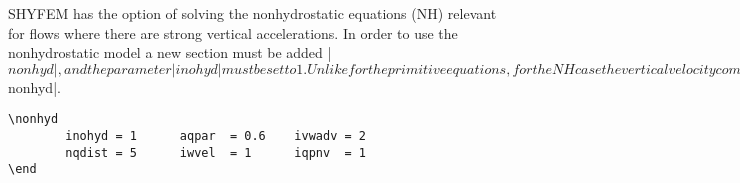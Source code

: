 
%
%
%
%
%
%
%

SHYFEM has the option of solving the nonhydrostatic equations (NH) relevant for flows where there are strong vertical accelerations. In order to use the nonhydrostatic model a new section must be added |$nonhyd|, and the parameter |inohyd| must be set to 1. Unlike for the primitive equations, for the NH case the vertical velocity component is a prognostic variable which is solved from the vertical momentum equation. The full NH equations are solved following the two step approach of Casulli (1999) whereby in the first step only the hydrostatic equations are solved, followed by a second step where the NH pressure is computed through the solution of a 3D Poisson equation, and then used to correct the hydrostatic fields. The semi-implicit weighting parameter for the nonhydrostatic pressure term is given by the parameter aqpar which must be given a value between 0 and 1 (default value is 0.5). Both the vertical velocity and nonhydrostatic pressure variables can be output to a file by setting the parameters |iwvel| and |iqpnv| equal to 1 respectively. There is a option to exclude the NH terms at or near boundaries where sometimes problems can arise with the gradient of the NH pressure term. This is done by setting |inhbnd=1| and setting the parameter |nqdist| to the an integer value greater than 0 which is the number of nodes distance from the boundary where the NH terms are excluded. The parameter |ivwadv| chooses the scheme used to do the vertical advection of the vertical momentum, 1 being for a upwind scheme, 2 being for a centred differencing scheme, and 0 excludes this term. Below is an example of the new section |$nonhyd|. 
\begin{verbatim}
\nonhyd
        inohyd = 1      aqpar  = 0.6    ivwadv = 2
        nqdist = 5      iwvel  = 1      iqpnv  = 1
\end
\end{verbatim}


